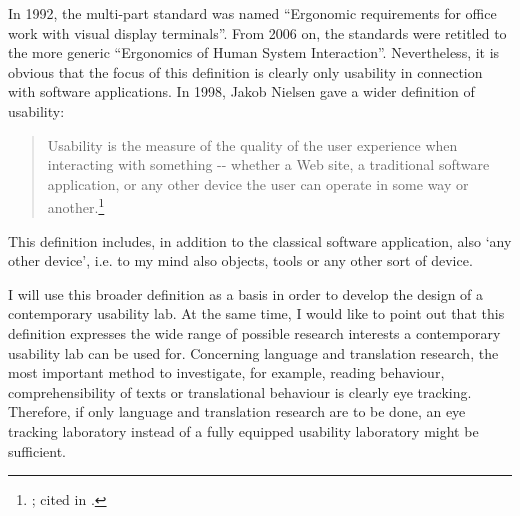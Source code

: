 \documentclass[output=paper]{langsci/langscibook}
\begin{document}
In 1992, the multi-part standard was named ``Ergonomic requirements for office work with visual display terminals''. From 2006 on, the standards were retitled to the more generic ``Ergonomics of Human System Interaction''. Nevertheless, it is obvious that the focus of this definition is clearly only usability in connection with software applications. In 1998, Jakob Nielsen gave a wider definition of usability:

\begin{quote}
Usability is the measure of the quality of the user experience when interacting with something -{}- whether a Web site, a traditional software application, or any other device the user can operate in some way or another.\footnote{ \citet{Nielsen1998}; cited in \citet{Eichinger1999}.}
\end{quote}

This definition includes, in addition to the classical software application, also `any other device', i.e. to my mind also objects, tools or any other sort of device. 

I will use this broader definition as a basis in order to develop the design of a contemporary usability lab. At the same time, I would like to point out that this definition expresses the wide range of possible research interests a contemporary usability lab can be used for. Concerning language and translation research, the most important method to investigate, for example, reading behaviour, comprehensibility of texts or translational behaviour is clearly eye tracking. Therefore, if only language and translation research are to be done, an eye tracking laboratory instead of a fully equipped usability laboratory might be sufficient.
\end{document}
